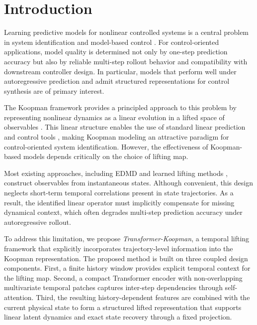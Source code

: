 \documentclass[journal]{IEEEtran}
\begin{document}
\section{Introduction}
\label{sec:introduction}

Learning predictive models for nonlinear controlled systems is a central problem in system identification and model-based control \cite{ljung1999system, vanoverschee1994n4sid, nelles2020nonlinear}. For control-oriented applications, model quality is determined not only by one-step prediction accuracy but also by reliable multi-step rollout behavior and compatibility with downstream controller design. In particular, models that perform well under autoregressive prediction and admit structured representations for control synthesis are of primary interest.

The Koopman framework provides a principled approach to this problem by representing nonlinear dynamics as a linear evolution in a lifted space of observables \cite{koopman1931hamiltonian, brunton2022modern}. This linear structure enables the use of standard linear prediction and control tools \cite{otto2021koopman, korda2018linear}, making Koopman modeling an attractive paradigm for control-oriented system identification. However, the effectiveness of Koopman-based models depends critically on the choice of lifting map.

Most existing approaches, including EDMD \cite{williams2015data} and learned lifting methods \cite{lusch2018deep, takeishi2017koopman}, construct observables from instantaneous states. Although convenient, this design neglects short-term temporal correlations present in state trajectories. As a result, the identified linear operator must implicitly compensate for missing dynamical context, which often degrades multi-step prediction accuracy under autoregressive rollout.

To address this limitation, we propose \emph{Transformer-Koopman}, a temporal lifting framework that explicitly incorporates trajectory-level information into the Koopman representation. The proposed method is built on three coupled design components. First, a finite history window provides explicit temporal context for the lifting map. Second, a compact Transformer encoder with non-overlapping multivariate temporal patches captures inter-step dependencies through self-attention. Third, the resulting history-dependent features are combined with the current physical state to form a structured lifted representation that supports linear latent dynamics and exact state recovery through a fixed projection.
\end{document}
